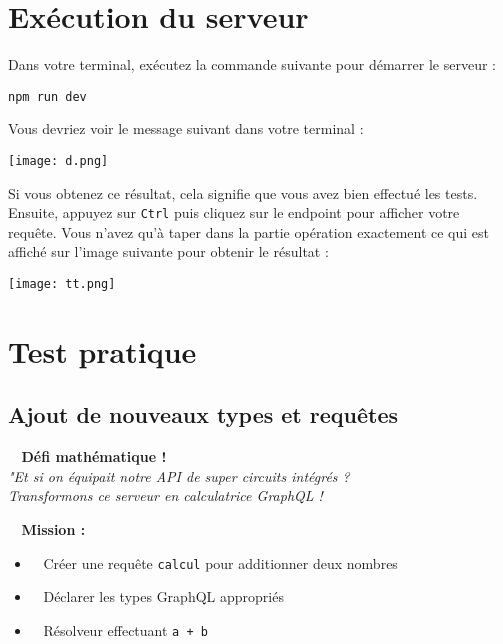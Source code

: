 \documentclass{article}
\begin{document}
\section{Exécution du serveur}

Dans votre terminal, exécutez la commande suivante pour démarrer le serveur :

\begin{lstlisting}[style=custombash]
npm run dev
\end{lstlisting}

Vous devriez voir le message suivant dans votre terminal :

\begin{center}
\texttt{[image: d.png]}
\end{center}

Si vous obtenez ce résultat, cela signifie que vous avez bien effectué les tests. Ensuite, appuyez sur \texttt{Ctrl} puis cliquez sur le endpoint pour afficher votre requête. Vous n'avez qu'à taper dans la partie opération exactement ce qui est affiché sur l'image suivante pour obtenir le résultat :

\begin{center}
\texttt{[image: tt.png]}
\end{center}

\section{Test pratique}
\subsection{Ajout de nouveaux types et requêtes \faMagic\ \faCalculator}

\textbf{\faSuperpowers~ Défi mathématique !} \\ 
\emph{"Et si on équipait notre API de super circuits intégrés ?} \\ 
\emph{Transformons ce serveur en calculatrice GraphQL ! \faRocket\ \faDivide}

\begin{tcolorbox}[ colback=blue!5!white,
    colframe=blue!75!black,]
\textbf{\faLightbulbO~ Mission :}
\begin{itemize}
    \item \faCode~ Créer une requête \texttt{calcul} pour additionner deux nombres
    \item \faPuzzlePiece~ Déclarer les types GraphQL appropriés
    \item \faCogs~ Résolveur effectuant \texttt{a + b}
  
\end{itemize}
\end{tcolorbox}
\end{document}
